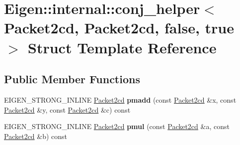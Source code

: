 \hypertarget{struct_eigen_1_1internal_1_1conj__helper_3_01_packet2cd_00_01_packet2cd_00_01false_00_01true_01_4}{}\section{Eigen\+:\+:internal\+:\+:conj\+\_\+helper$<$ Packet2cd, Packet2cd, false, true $>$ Struct Template Reference}
\label{struct_eigen_1_1internal_1_1conj__helper_3_01_packet2cd_00_01_packet2cd_00_01false_00_01true_01_4}
\subsection*{Public Member Functions}
\begin{DoxyCompactItemize}
\item 
\mbox{\label{struct_eigen_1_1internal_1_1conj__helper_3_01_packet2cd_00_01_packet2cd_00_01false_00_01true_01_4_ade4bdd34fc1f6e68d7b988778b5574bf}} 
E\+I\+G\+E\+N\+\_\+\+S\+T\+R\+O\+N\+G\+\_\+\+I\+N\+L\+I\+NE \hyperlink{struct_eigen_1_1internal_1_1_packet2cd}{Packet2cd} {\bfseries pmadd} (const \hyperlink{struct_eigen_1_1internal_1_1_packet2cd}{Packet2cd} \&x, const \hyperlink{struct_eigen_1_1internal_1_1_packet2cd}{Packet2cd} \&y, const \hyperlink{struct_eigen_1_1internal_1_1_packet2cd}{Packet2cd} \&c) const
\item 
\mbox{\label{struct_eigen_1_1internal_1_1conj__helper_3_01_packet2cd_00_01_packet2cd_00_01false_00_01true_01_4_a7467ccb1243cb2f7cbcd143fecb9824e}} 
E\+I\+G\+E\+N\+\_\+\+S\+T\+R\+O\+N\+G\+\_\+\+I\+N\+L\+I\+NE \hyperlink{struct_eigen_1_1internal_1_1_packet2cd}{Packet2cd} {\bfseries pmul} (const \hyperlink{struct_eigen_1_1internal_1_1_packet2cd}{Packet2cd} \&a, const \hyperlink{struct_eigen_1_1internal_1_1_packet2cd}{Packet2cd} \&b) const
\item 
\mbox{\label{struct_eigen_1_1internal_1_1conj__helper_3_01_packet2cd_00_01_packet2cd_00_01false_00_01true_01_4_ade4bdd34fc1f6e68d7b988778b5574bf}} 

\end{DoxyCompactItemize}
